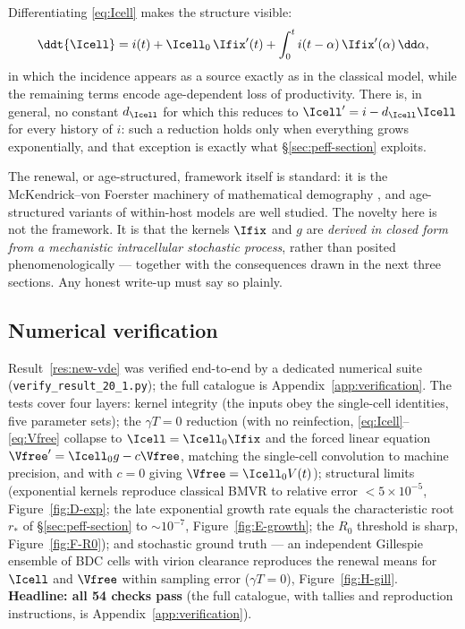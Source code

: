 Differentiating \eqref{eq:Icell} makes the structure visible:
\begin{equation}
\ddt{\Icell}
= i(t)+\Icell_0\,\Ifix'(t)+\int_0^t i(t-\alpha)\,\Ifix'(\alpha)\,\dd\alpha,
\end{equation}
in which the incidence appears as a source exactly as in the classical
model, while the remaining terms encode age-dependent loss of
productivity. There is, in general, no constant $d_{\Icell}$ for which this
reduces to $\Icell'=i-d_{\Icell}\Icell$ for every history of $i$: such a
reduction holds only when everything grows exponentially, and that exception
is exactly what \S\ref{sec:peff-section} exploits.

\begin{remark}
\label{rem:novelty}
The renewal, or age-structured, framework itself is standard: it is the
McKendrick--von Foerster machinery of mathematical demography
\cite{mckendrick1926applications,vonfoerster1959some}, and age-structured
variants of within-host models are well studied. The novelty here is not
the framework. It is that the kernels $\Ifix$ and $g$ are \emph{derived in
closed form from a mechanistic intracellular stochastic process}, rather
than posited phenomenologically --- together with the consequences drawn in
the next three sections. Any honest write-up must say so plainly.
\end{remark}

\subsection{Numerical verification}
\label{sec:renewal-verification}

Result~\ref{res:new-vde} was verified end-to-end by a dedicated numerical
suite (\texttt{verify\_result\_20\_1.py}); the full catalogue is
Appendix~\ref{app:verification}. The tests cover four layers: kernel
integrity (the inputs obey the single-cell identities, five parameter
sets); the $\gamma T=0$ reduction (with no reinfection, \eqref{eq:Icell}--
\eqref{eq:Vfree} collapse to $\Icell=\Icell_0\Ifix$ and the forced linear
equation $\Vfree'=\Icell_0 g-c\Vfree$, matching the single-cell
convolution to machine precision, and with $c=0$ giving
$\Vfree=\Icell_0 V(t)$); structural limits (exponential kernels reproduce
classical BMVR to relative error $<5\times10^{-5}$,
Figure~\ref{fig:D-exp}; the late exponential growth rate equals the
characteristic root $r_*$ of \S\ref{sec:peff-section} to $\sim10^{-7}$,
Figure~\ref{fig:E-growth}; the $R_0$ threshold is sharp,
Figure~\ref{fig:F-R0}); and stochastic ground truth --- an independent
Gillespie ensemble of BDC cells with virion clearance reproduces the
renewal means for $\Icell$ and $\Vfree$ within sampling error
($\gamma T=0$), Figure~\ref{fig:H-gill}. \textbf{Headline: all 54 checks
pass} (the full catalogue, with tallies and reproduction instructions, is
Appendix~\ref{app:verification}).

